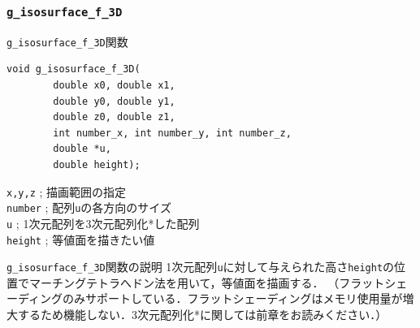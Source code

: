 \documentclass[platex,a4paper,12pt]{jsarticle}%
\begin{document}
\begin{figure}[htb]
\end{figure}


\clearpage
\subsubsection{\texttt{g\_isosurface\_f\_3D}}

\begin{itembox}[l]{\texttt{g\_isosurface\_f\_3D}関数}
\begin{verbatim}
void g_isosurface_f_3D(
        double x0, double x1,
        double y0, double y1,
        double z0, double z1,
        int number_x, int number_y, int number_z,
        double *u,
        double height);
\end{verbatim}
\verb|x,y,z| ; 描画範囲の指定\\
\verb|number| ; 配列\verb|u|の各方向のサイズ\\
\verb|u| ; 1次元配列を3次元配列化*した配列\\
\verb|height| ; 等値面を描きたい値\\
\end{itembox}

\begin{itembox}[l]{\texttt{g\_isosurface\_f\_3D}関数の説明}
1次元配列\verb|u|に対して与えられた高さ\verb|height|の位置でマーチングテトラへドン法を用いて，等値面を描画する．
（フラットシェーディングのみサポートしている．フラットシェーディングはメモリ使用量が増大するため機能しない．3次元配列化*に関しては前章をお読みください．）
\end{itembox}
\end{document}
